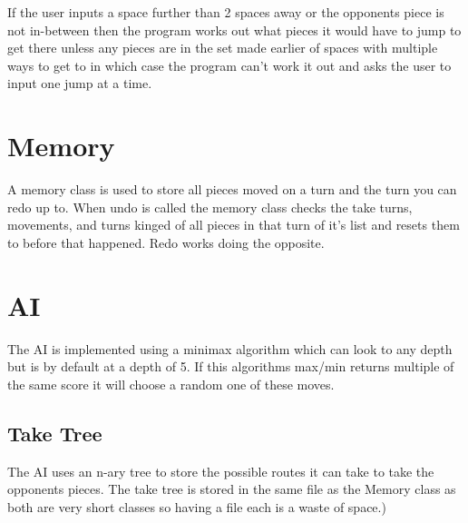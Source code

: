 \documentclass[10pt, a4paper]{article}
\begin{document}
    If the user inputs a space further than 2 spaces away or the opponents piece is not in-between then the program works out what pieces it would have to jump to get there unless any pieces are in the set made earlier of spaces with multiple ways to get to in which case the program can't work it out and asks the user to input one jump at a time.
    
    \section{Memory}
    A memory class is used to store all pieces moved on a turn and the turn you can redo up to. When undo is called the memory class checks the take turns, movements, and turns kinged of all pieces in that turn of it's list and resets them to before that happened. Redo works doing the opposite.
    
    \section{AI}
    The AI is implemented using a minimax algorithm which can look to any depth but is by default at a depth of 5. If this algorithms max/min returns multiple of the same score it will choose a random one of these moves.
    
    \subsection{Take Tree}
    The AI uses an n-ary tree to store the possible routes it can take to take the opponents pieces. The take tree is stored in the same file as the Memory class as both are very short classes so having a file each is a waste of space.\cite{Minimax})
	



		
\end{document}

